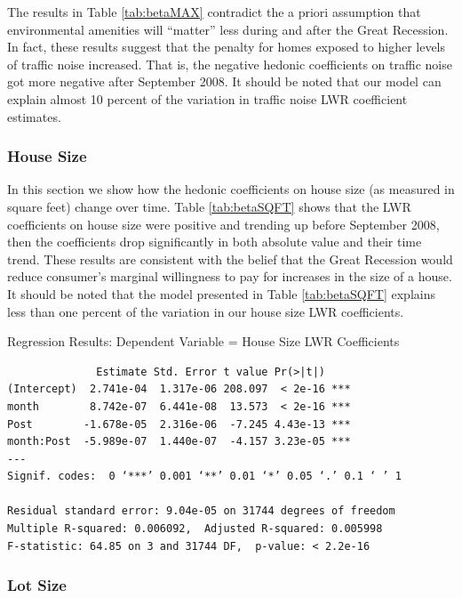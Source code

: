 \documentclass{article}\usepackage{graphicx, color}
\begin{document}
The results in Table \ref{tab:betaMAX} contradict the a priori assumption that environmental amenities will ``matter'' less during and after the Great Recession. In fact, these results suggest that the penalty for homes exposed to higher levels of traffic noise increased. That is, the negative hedonic coefficients on traffic noise got more negative after September 2008. It should be noted that our model can explain almost 10 percent of the variation in traffic noise LWR coefficient estimates. 

\subsubsection{House Size}

In this section we show how the hedonic coefficients on house size (as measured in square feet) change over time. Table \ref{tab:betaSQFT} shows that the LWR coefficients on house size were positive and trending up before September 2008, then the coefficients drop significantly in both absolute value and their time trend. These results are consistent with the belief that the Great Recession would reduce consumer's marginal willingness to pay for increases in the size of a house. It should be noted that the model presented in Table \ref{tab:betaSQFT} explains less than one percent of the variation in our house size LWR coefficients.

\begin{table}[h]
\caption{Regression Results: Dependent Variable = House Size LWR Coefficients}\label{tab:betaSQFT}
\begin{verbatim}
              Estimate Std. Error t value Pr(>|t|)    
(Intercept)  2.741e-04  1.317e-06 208.097  < 2e-16 ***
month        8.742e-07  6.441e-08  13.573  < 2e-16 ***
Post        -1.678e-05  2.316e-06  -7.245 4.43e-13 ***
month:Post  -5.989e-07  1.440e-07  -4.157 3.23e-05 ***
---
Signif. codes:  0 ‘***’ 0.001 ‘**’ 0.01 ‘*’ 0.05 ‘.’ 0.1 ‘ ’ 1 

Residual standard error: 9.04e-05 on 31744 degrees of freedom
Multiple R-squared: 0.006092,  Adjusted R-squared: 0.005998 
F-statistic: 64.85 on 3 and 31744 DF,  p-value: < 2.2e-16 
\end{verbatim}
\end{table}

\subsubsection{Lot Size}
\end{document}
